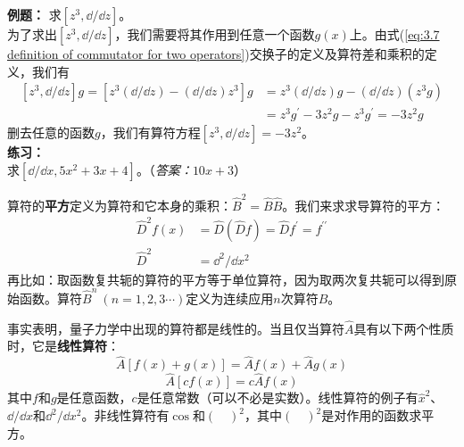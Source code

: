 	\begin{examplebox}
		\textbf{例题：}
		求$\left[z^3,\dd /\dd z\right]$。\\
		
		为了求出$\left[z^3,\dd /\dd z\right]$，我们需要将其作用到任意一个函数$g\left(x\right)$上。由式(\ref{eq:3.7 definition of commutator for two operators})交换子的定义及算符差和乘积的定义，我们有
		\begin{equation*}
			\begin{aligned}
				\left[z^3,\dd /\dd z\right]g = \left[z^3\left(\dd /\dd z\right) - \left(\dd /\dd z\right)z^3\right]g & = z^3\left(\dd /\dd z\right)g - \left(\dd /\dd z\right)\left(z^3g\right) \\
				& = z^3g^{\prime} - 3z^2g-z^3g^{\prime} = -3z^2g
			\end{aligned}
		\end{equation*}
		删去任意的函数$g$，我们有算符方程$\left[z^3,\dd /\dd z\right] = -3z^2$。\\
		
		\textbf{练习：}\\
		求$\left[\dd /\dd x, 5x^2+3x+4\right]$。（\textit{答案：}$10x+3$）
	\end{examplebox}

	算符的\textbf{平方}定义为算符和它本身的乘积：$\hat{B}^2 = \hat{B}\hat{B}$。我们来求求导算符的平方：
	\begin{equation*}
		\begin{aligned}
			\hat{D}^2f\left(x\right) & = \hat{D}\left(\hat{D}f\right) = \hat{D}f^{\prime} = f^{\prime \prime} \\
			\hat{D}^2& = \dd ^2/\dd x^2
		\end{aligned}
	\end{equation*}
	再比如：取函数复共轭的算符的平方等于单位算符，因为取两次复共轭可以得到原始函数。算符$\hat{B}^n \: \left(n = 1,2,3\cdots\right)$定义为连续应用$n$次算符$\hat{B}$。

	事实表明，量子力学中出现的算符都是线性的。当且仅当算符$\hat{A}$具有以下两个性质时，它是\textbf{线性算符}：
	\begin{equation}
		\boxed{
			\hat{A}\left[f\left(x\right)+g\left(x\right)\right] = \hat{A}f\left(x\right)+\hat{A}g\left(x\right)
		}
		\label{eq:3.9}
	\end{equation}
	\begin{equation}
		\boxed{
			\hat{A}\left[cf\left(x\right)\right] = c\hat{A}f\left(x\right)
		}
		\label{eq:3.10}
	\end{equation}
	其中$f$和$g$是任意函数，$c$是任意常数（可以不必是实数）。线性算符的例子有$\hat{x}^2$、$\dd /\dd x$和$\dd ^2/\dd x^2$。非线性算符有$\cos$和$\left(\quad\right)^2$，其中$\left(\quad\right)^2$是对作用的函数求平方。

